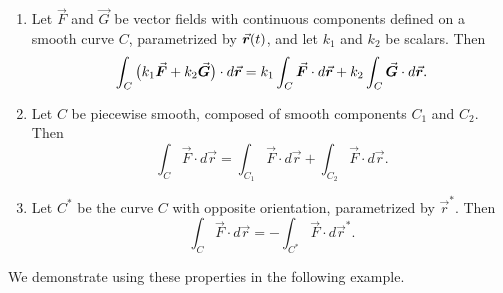 \begin{enumerate}
	\item	Let $\vec F$ and $\vec G$ be  vector fields with continuous components defined on a smooth curve $C$, parametrized by $\vrt$, and let $k_1$ and $k_2$ be scalars. Then
	$$\ds \int_C\big(k_1\vec F+k_2\vec G\big)\cdot d\vec r = k_1\int_C\vec F\cdot d\vec r +k_2\int_C\vec G\cdot d\vec r.$$
	\item Let $C$ be piecewise smooth, composed of smooth components $C_1$ and $C_2$. Then
	$$\int_C\vec F\cdot d\vec r = \int_{C_1}\vec F\cdot d\vec r + \int_{C_2}\vec F\cdot d\vec r.$$
	\item	Let $C^*$ be the curve $C$ with opposite orientation, parametrized by $\vec r^*$. Then
	$$\int_C\vec F\cdot d\vec r = -\int_{C^*}\vec F\cdot d\vec r^*.$$
	\end{enumerate}

We demonstrate using these properties in the following example.

